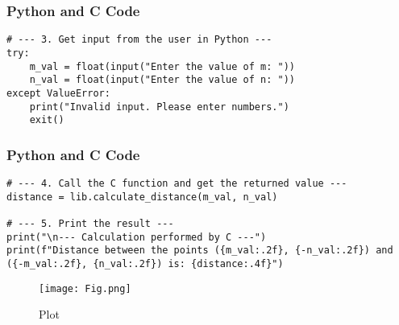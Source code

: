 \documentclass{beamer}
\begin{document}
\begin{frame}[fragile]
\frametitle{Python and C Code}

\begin{lstlisting}
# --- 3. Get input from the user in Python ---
try:
    m_val = float(input("Enter the value of m: "))
    n_val = float(input("Enter the value of n: "))
except ValueError:
    print("Invalid input. Please enter numbers.")
    exit()
\end{lstlisting}
\end{frame}

\begin{frame}[fragile]
\frametitle{Python and C Code}

\begin{lstlisting}
# --- 4. Call the C function and get the returned value ---
distance = lib.calculate_distance(m_val, n_val)

# --- 5. Print the result ---
print("\n--- Calculation performed by C ---")
print(f"Distance between the points ({m_val:.2f}, {-n_val:.2f}) and ({-m_val:.2f}, {n_val:.2f}) is: {distance:.4f}")
\end{lstlisting}

\end{frame}

\begin{figure}[H]
    \centering
    \texttt{[image: Fig.png]}
    \caption{Plot}
    \label{fig:placeholder}
\end{figure}
\end{document}
